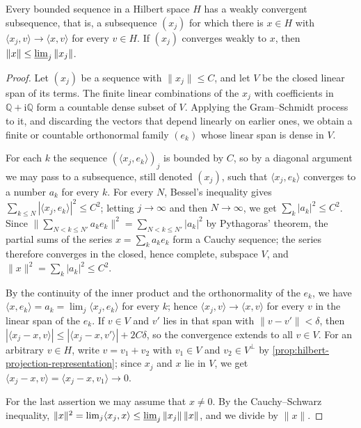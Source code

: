 \begin{proposition}\label{prop:hilbert-weak-sequences}
Every bounded sequence in a Hilbert space $H$ has a weakly convergent subsequence, that is, a subsequence $(x_j)$ for which there is $x\in H$ with $\langle x_j,v\rangle\to\langle x,v\rangle$ for every $v\in H$. If $(x_j)$ converges weakly to $x$, then $\|x\|\le\varliminf_j\|x_j\|$.
\end{proposition}
\begin{proof}
Let $(x_j)$ be a sequence with $\|x_j\|\le C$, and let $V$ be the closed linear span of its terms. The finite linear combinations of the $x_j$ with coefficients in $\mathbb Q+\mathrm i\mathbb Q$ form a countable dense subset of $V$. Applying the Gram--Schmidt process to it, and discarding the vectors that depend linearly on earlier ones, we obtain a finite or countable orthonormal family $(e_k)$ whose linear span is dense in $V$.

For each $k$ the sequence $(\langle x_j,e_k\rangle)_j$ is bounded by $C$, so by a diagonal argument we may pass to a subsequence, still denoted $(x_j)$, such that $\langle x_j,e_k\rangle$ converges to a number $a_k$ for every $k$. For every $N$, Bessel's inequality gives $\sum_{k\le N}|\langle x_j,e_k\rangle|^2\le C^2$; letting $j\to\infty$ and then $N\to\infty$, we get $\sum_k|a_k|^2\le C^2$. Since $\|\sum_{N<k\le N'}a_ke_k\|^2=\sum_{N<k\le N'}|a_k|^2$ by Pythagoras' theorem, the partial sums of the series $x=\sum_ka_ke_k$ form a Cauchy sequence; the series therefore converges in the closed, hence complete, subspace $V$, and $\|x\|^2=\sum_k|a_k|^2\le C^2$.

By the continuity of the inner product and the orthonormality of the $e_k$, we have $\langle x,e_k\rangle=a_k=\lim_j\langle x_j,e_k\rangle$ for every $k$; hence $\langle x_j,v\rangle\to\langle x,v\rangle$ for every $v$ in the linear span of the $e_k$. If $v\in V$ and $v'$ lies in that span with $\|v-v'\|<\delta$, then $|\langle x_j-x,v\rangle|\le|\langle x_j-x,v'\rangle|+2C\delta$, so the convergence extends to all $v\in V$. For an arbitrary $v\in H$, write $v=v_1+v_2$ with $v_1\in V$ and $v_2\in V^\perp$ by \cref{prop:hilbert-projection-representation}; since $x_j$ and $x$ lie in $V$, we get $\langle x_j-x,v\rangle=\langle x_j-x,v_1\rangle\to0$.

For the last assertion we may assume that $x\ne0$. By the Cauchy--Schwarz inequality, $\|x\|^2=\lim_j\langle x_j,x\rangle\le\varliminf_j\|x_j\|\,\|x\|$, and we divide by $\|x\|$.
\end{proof}

